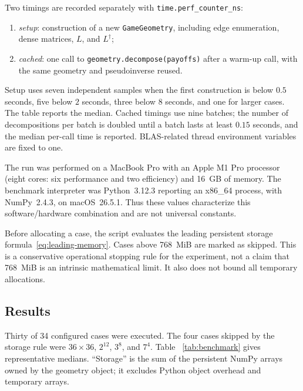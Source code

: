 \documentclass[11pt]{article}
\begin{document}
Two timings are recorded separately with \texttt{time.perf\_counter\_ns}:
\begin{enumerate}
 \item \emph{setup}: construction of a new \texttt{GameGeometry}, including
       edge enumeration, dense matrices, $L$, and $L^\dagger$;
 \item \emph{cached}: one call to \texttt{geometry.decompose(payoffs)} after a
       warm-up call, with the same geometry and pseudoinverse reused.
\end{enumerate}
Setup uses seven independent samples when the first construction is below
$0.5$ seconds, five below $2$ seconds, three below $8$ seconds, and one for
larger cases.  The table reports the median.  Cached timings use nine batches;
the number of decompositions per batch is doubled until a batch lasts at least
$0.15$ seconds, and the median per-call time is reported.  BLAS-related thread
environment variables are fixed to one.

The run was performed on a MacBook Pro with an Apple M1 Pro processor (eight
cores: six performance and two efficiency) and 16~GB of memory.  The benchmark
interpreter was Python~3.12.3 reporting an x86\_64 process, with NumPy~2.4.3,
on macOS~26.5.1.  Thus these values characterize this software/hardware
combination and are not universal constants.

Before allocating a case, the script evaluates the leading persistent storage
formula~\eqref{eq:leading-memory}.  Cases above 768~MiB are marked as skipped.
This is a conservative operational stopping rule for the experiment, not a
claim that 768~MiB is an intrinsic mathematical limit.  It also does not bound
all temporary allocations.

\subsection{Results}

Thirty of 34 configured cases were executed.  The four cases skipped by the
storage rule were $36\times36$, $2^{12}$, $3^8$, and $7^4$.  Table
~\ref{tab:benchmark} gives representative medians.  ``Storage'' is the sum of
the persistent NumPy arrays owned by the geometry object; it excludes Python
object overhead and temporary arrays.
\end{document}
